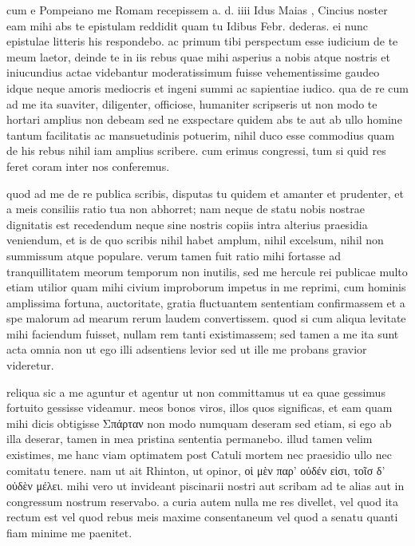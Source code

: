 


 cum e Pompeiano me Romam recepissem a. d. iiii Idus Maias , Cincius noster eam mihi abs te epistulam reddidit quam tu Idibus Febr. dederas. ei nunc epistulae litteris his respondebo. ac primum tibi perspectum esse iudicium de te meum laetor, deinde te in iis rebus quae mihi asperius a nobis atque nostris et iniucundius actae videbantur moderatissimum fuisse vehementissime gaudeo idque neque amoris mediocris et ingeni summi ac sapientiae iudico. qua de re cum ad me ita suaviter, diligenter, officiose, humaniter scripseris ut non modo te hortari amplius non debeam sed ne exspectare quidem abs te aut ab ullo homine tantum facilitatis ac mansuetudinis potuerim, nihil duco esse commodius quam de his rebus nihil iam amplius scribere. cum erimus congressi, tum si quid res feret coram inter nos conferemus.

 quod ad me de re publica scribis, disputas tu quidem et amanter et prudenter, et a meis consiliis ratio tua non abhorret; nam neque de statu nobis nostrae dignitatis est recedendum neque sine nostris copiis intra alterius praesidia veniendum, et is de quo scribis nihil habet amplum, nihil excelsum, nihil non summissum atque populare. verum tamen fuit ratio mihi fortasse ad tranquillitatem meorum temporum non inutilis, sed me hercule rei publicae multo etiam utilior quam mihi civium improborum impetus in me reprimi, cum hominis amplissima fortuna, auctoritate, gratia fluctuantem sententiam confirmassem et a spe malorum ad mearum rerum laudem convertissem. quod si cum aliqua levitate mihi faciendum fuisset, nullam rem tanti existimassem; sed tamen a me ita sunt acta omnia non ut ego illi adsentiens levior sed ut ille me probans gravior videretur.

 reliqua sic a me aguntur et agentur ut non committamus ut ea quae gessimus fortuito gessisse videamur. meos bonos viros, illos quos significas, et eam quam mihi dicis obtigisse Σπάρταν non modo numquam deseram sed etiam, si ego ab illa deserar, tamen in mea pristina sententia permanebo. illud tamen velim existimes, me hanc viam optimatem post Catuli mortem nec praesidio ullo nec comitatu tenere. nam ut ait Rhinton, ut opinor, οἱ μὲν παρ' οὐδέν εἰσι, τοῖσ δ' οὐδὲν μέλει. mihi vero ut invideant piscinarii nostri aut scribam ad te alias aut in congressum nostrum reservabo. a curia autem nulla me res divellet, vel quod ita rectum est vel quod rebus meis maxime consentaneum vel quod a senatu quanti fiam minime me paenitet.

